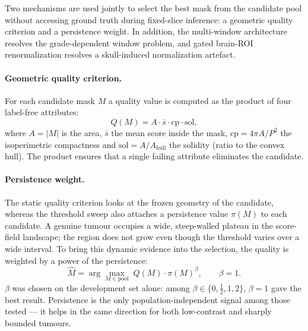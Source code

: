 \documentclass[11pt,a4paper]{article}
\begin{document}
Two mechanisms are used jointly to select the best mask from the candidate pool
without accessing ground truth during fixed-slice inference: a geometric quality
criterion and a persistence weight. In addition, the multi-window architecture
resolves the grade-dependent window problem, and gated brain-ROI renormalization
resolves a skull-induced normalization artefact.

\paragraph{Geometric quality criterion.} For each candidate mask $M$ a quality
value is computed as the product of four label-free attributes:
\begin{equation}
Q(M)=A\cdot \bar{s}\cdot \mathrm{cp}\cdot \mathrm{sol},
\label{eq:quality}
\end{equation}
where $A=|M|$ is the area, $\bar{s}$ the mean score inside the mask,
$\mathrm{cp}=4\pi A/P^2$ the isoperimetric compactness and
$\mathrm{sol}=A/A_{\text{hull}}$ the solidity (ratio to the convex hull). The
product ensures that a single failing attribute eliminates the candidate.

\paragraph{Persistence weight.} The static quality criterion looks at the frozen
geometry of the candidate, whereas the threshold sweep also attaches a persistence
value $\pi(M)$ to each candidate. A genuine tumour occupies a wide, steep-walled
plateau in the score-field landscape; the region does not grow even though the
threshold varies over a wide interval. To bring this dynamic evidence into the
selection, the quality is weighted by a power of the persistence:
\begin{equation}
\hat M=\arg\max_{M\in\text{pool}}\; Q(M)\cdot \pi(M)^{\beta},\qquad \beta=1.
\label{eq:select}
\end{equation}
$\beta$ was chosen on the development set alone: among
$\beta\in\{0,\tfrac12,1,2\}$, $\beta=1$ gave the best result. Persistence is the
only population-independent signal among those tested --- it helps in the same
direction for both low-contrast and sharply bounded tumours.
\end{document}

